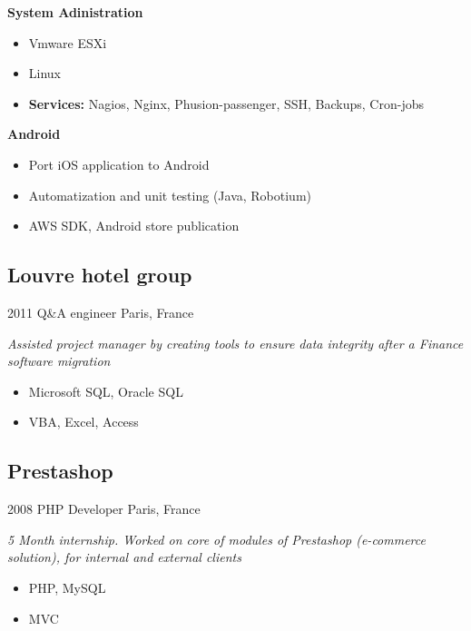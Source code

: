 \documentclass[]{template/friggeri-cv} %
\begin{document}
\begin{entrylist}
{%
\textbf{System Adinistration} 
\begin{itemize}
\item Vmware ESXi
\item Linux
\item \textbf{Services:} Nagios, Nginx, Phusion-passenger, SSH, Backups, Cron-jobs
\end{itemize}

\textbf{Android} 
\begin{itemize}
\item Port iOS application to Android
\item Automatization and unit testing (Java, Robotium)
\item AWS SDK, Android store publication
\end{itemize}
}

\end{entrylist}



\subsection{Louvre hotel group}
\begin{entrylist}
\entry
{2011}
{Q\&A engineer}
{Paris, France}
{\emph{Assisted project manager by creating tools to ensure data integrity after a Finance software migration}

\begin{itemize}
\item {Microsoft SQL, Oracle SQL}
\item {VBA, Excel, Access}

\end{itemize}
}
\end{entrylist}

\goodbreak
\subsection{Prestashop}
\begin{entrylist}
\entry
{2008}
{PHP Developer}
{Paris, France}
{\emph{5 Month internship. Worked on core of modules of Prestashop (e-commerce solution), for internal and external clients}

\begin{itemize}

\item {PHP, MySQL}
\item {MVC}

\end{itemize}
}
\end{entrylist}
\end{document}
